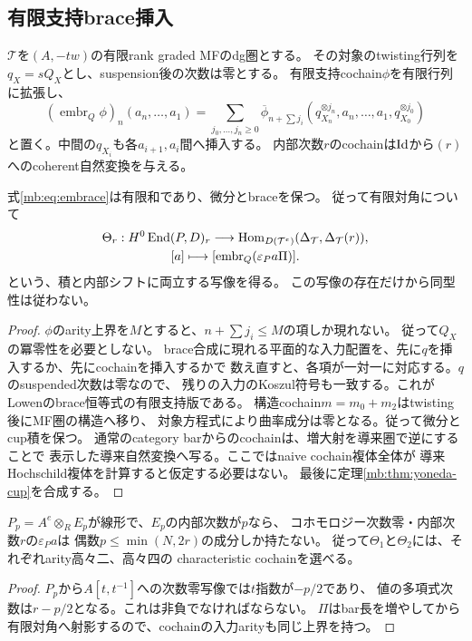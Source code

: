 \subsection{有限支持brace挿入}
$\mathcal T$を$(A,-tw)$の有限rank graded MFのdg圏とする。
その対象のtwisting行列を$q_X=sQ_X$とし、suspension後の次数は零とする。
有限支持cochain$\phi$を有限行列に拡張し、
\begin{equation}\label{mb:eq:embrace}
 (\operatorname{embr}_Q\phi)_n(a_n,\ldots,a_1)=
 \sum_{j_0,\ldots,j_n\ge0}
 \overline\phi_{n+\sum j_i}
 (q_{X_n}^{\otimes j_n},a_n,\ldots,a_1,q_{X_0}^{\otimes j_0})
\end{equation}
と置く。中間の$q_{X_i}$も各$a_{i+1},a_i$間へ挿入する。
内部次数$r$のcochainは$\operatorname{Id}$から$(r)$へのcoherent自然変換を与える。

\begin{proposition}[乗法的characteristic写像]\label{mb:prop:characteristic}
式\eqref{mb:eq:embrace}は有限和であり、微分とbraceを保つ。
従って有限対角について
\[
 \begin{gathered}
 \Theta_r:H^0\operatorname{End}(P,D)_r\longrightarrow
 \operatorname{Hom}_{D(\mathcal T^e)}(\Delta_{\mathcal T},\Delta_{\mathcal T}(r)),\\
 [a] \longmapsto [\operatorname{embr}_Q(\varepsilon_Pa\Pi)].
 \end{gathered}
\]
という、積と内部シフトに両立する写像を得る。
この写像の存在だけから同型性は従わない。
\end{proposition}
\begin{proof}
$\phi$のarity上界を$M$とすると、$n+\sum j_i\le M$の項しか現れない。
従って$Q_X$の冪零性を必要としない。
brace合成に現れる平面的な入力配置を、先に$q$を挿入するか、先にcochainを挿入するかで
数え直すと、各項が一対一に対応する。$q$のsuspended次数は零なので、
残りの入力のKoszul符号も一致する。これがLowenのbrace恒等式の有限支持版である。
構造cochain$m=m_0+m_2$はtwisting後にMF圏の構造へ移り、
対象方程式により曲率成分は零となる。従って微分とcup積を保つ。
通常のcategory barからのcochainは、増大射を導来圏で逆にすることで
表示した導来自然変換へ写る。ここではnaive cochain複体全体が
導来Hochschild複体を計算すると仮定する必要はない。
最後に定理\ref{mb:thm:yoneda-cup}を合成する。
\end{proof}

\begin{corollary}[低rotation次数に必要なarity]\label{mb:cor:arity}
$P_p=A^e\otimes_R E_p$が線形で、$E_p$の内部次数が$p$なら、
コホモロジー次数零・内部次数$r$の$\varepsilon_Pa$は
偶数$p\le\min(N,2r)$の成分しか持たない。
従って$\Theta_1$と$\Theta_2$には、それぞれarity高々二、高々四の
characteristic cochainを選べる。
\end{corollary}
\begin{proof}
$P_p$から$A[t,t^{-1}]$への次数零写像では$t$指数が$-p/2$であり、
値の多項式次数は$r-p/2$となる。これは非負でなければならない。
$\Pi$はbar長を増やしてから有限対角へ射影するので、cochainの入力arityも同じ上界を持つ。
\end{proof}

